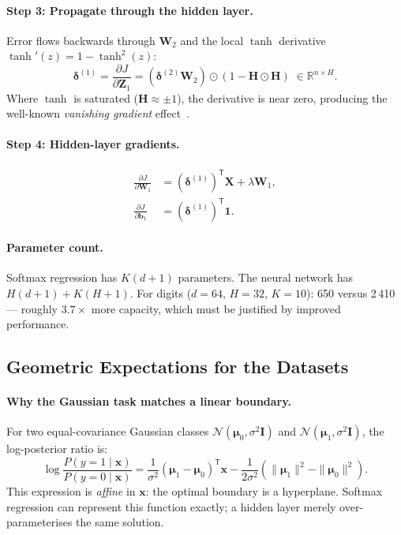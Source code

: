 \documentclass[sigconf,screen,nonacm]{acmart}
\newcommand{\R}{\mathbb{R}}
\newcommand{\1}{\mathbf{1}}
\newcommand{\vone}{\mathbf{1}}
\newcommand{\T}{\mathsf{T}}
\newcommand{\tanhact}{\operatorname{tanh}}
\newcommand{\vx}{\mathbf{x}}
\newcommand{\vbone}{\mathbf{b}_1}
\newcommand{\mX}{\mathbf{X}}
\newcommand{\mH}{\mathbf{H}}
\newcommand{\mWone}{\mathbf{W}_1}
\newcommand{\mWtwo}{\mathbf{W}_2}
\newcommand{\mZ}{\mathbf{Z}}
\newcommand{\bdelta}{\boldsymbol{\delta}}
\newcommand{\bmu}{\boldsymbol{\mu}}
\begin{document}
\paragraph{Step 3: Propagate through the hidden layer.}
Error flows backwards through $\mWtwo$ and the local $\tanh$ derivative
$\tanhact'(z)=1-\tanhact^2(z)$:
\begin{equation}\label{eq:nn_delta1}
  \bdelta^{(1)} = \frac{\partial J}{\partial\mZ_1}
  = (\bdelta^{(2)}\mWtwo)\odot(1-\mH\odot\mH)
  \;\in\R^{n\times H}.
\end{equation}
Where $\tanh$ is saturated ($\mH\approx\pm 1$), the derivative is near zero,
producing the well-known \emph{vanishing gradient} effect~\cite{goodfellow2016deep, cs231n_backprop}.

\paragraph{Step 4: Hidden-layer gradients.}
\begin{align}
  \frac{\partial J}{\partial \mWone} &=
    (\bdelta^{(1)})^\T\mX + \lambda\mWone, \label{eq:nn_dW1}\\[3pt]
  \frac{\partial J}{\partial \vbone} &=
    (\bdelta^{(1)})^\T\vone. \label{eq:nn_db1}
\end{align}

\paragraph{Parameter count.}
Softmax regression has $K(d+1)$ parameters.  The neural network has
$H(d+1)+K(H+1)$.  For digits ($d{=}64$, $H{=}32$, $K{=}10$): 650 versus
2\,410 — roughly $3.7\times$ more capacity, which must be justified by
improved performance.

\subsection{Geometric Expectations for the Datasets}
\label{sec:geometry}

\paragraph{Why the Gaussian task matches a linear boundary.}
For two equal-covariance Gaussian classes
$\mathcal{N}(\bmu_0,\sigma^2\mathbf{I})$ and
$\mathcal{N}(\bmu_1,\sigma^2\mathbf{I})$, the log-posterior ratio is:
\begin{equation}\label{eq:logodds}
  \log\frac{P(y{=}1\mid\vx)}{P(y{=}0\mid\vx)}
  = \frac{1}{\sigma^2}(\bmu_1-\bmu_0)^\T\vx
  - \frac{1}{2\sigma^2}(\|\bmu_1\|^2-\|\bmu_0\|^2).
\end{equation}
This expression is \emph{affine} in $\vx$: the optimal boundary is a
hyperplane.  Softmax regression can represent this function exactly; a hidden
layer merely over-parameterises the same solution.
\end{document}
